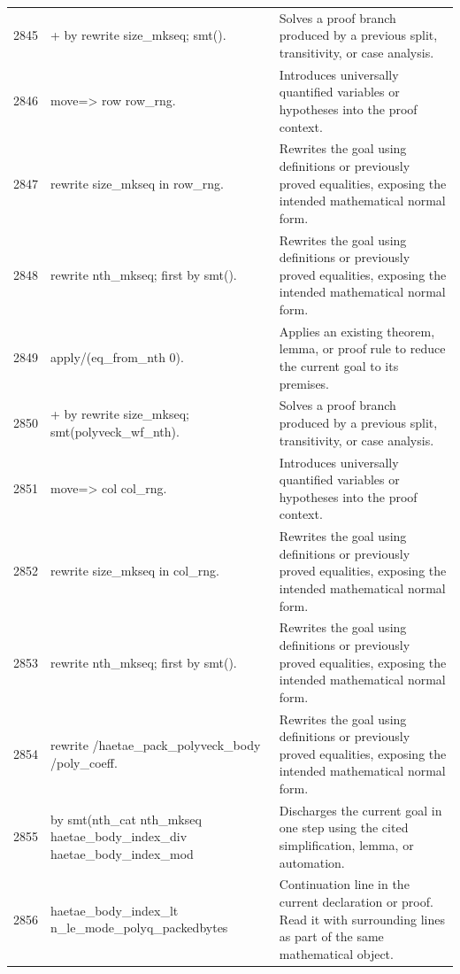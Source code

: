 \documentclass[10pt]{article}
\begin{document}
\begin{longtable}{r L{0.53\textwidth} L{0.37\textwidth}}
2845 & {\ttfamily\scriptsize + by rewrite size\_mkseq; smt().} & Solves a proof branch produced by a previous split, transitivity, or case analysis. \\
2846 & {\ttfamily\scriptsize move=> row row\_rng.} & Introduces universally quantified variables or hypotheses into the proof context. \\
2847 & {\ttfamily\scriptsize rewrite size\_mkseq in row\_rng.} & Rewrites the goal using definitions or previously proved equalities, exposing the intended mathematical normal form. \\
2848 & {\ttfamily\scriptsize rewrite nth\_mkseq; first by smt().} & Rewrites the goal using definitions or previously proved equalities, exposing the intended mathematical normal form. \\
2849 & {\ttfamily\scriptsize apply/(eq\_from\_nth 0).} & Applies an existing theorem, lemma, or proof rule to reduce the current goal to its premises. \\
2850 & {\ttfamily\scriptsize + by rewrite size\_mkseq; smt(polyveck\_wf\_nth).} & Solves a proof branch produced by a previous split, transitivity, or case analysis. \\
2851 & {\ttfamily\scriptsize move=> col col\_rng.} & Introduces universally quantified variables or hypotheses into the proof context. \\
2852 & {\ttfamily\scriptsize rewrite size\_mkseq in col\_rng.} & Rewrites the goal using definitions or previously proved equalities, exposing the intended mathematical normal form. \\
2853 & {\ttfamily\scriptsize rewrite nth\_mkseq; first by smt().} & Rewrites the goal using definitions or previously proved equalities, exposing the intended mathematical normal form. \\
2854 & {\ttfamily\scriptsize rewrite /haetae\_pack\_polyveck\_body /poly\_coeff.} & Rewrites the goal using definitions or previously proved equalities, exposing the intended mathematical normal form. \\
2855 & {\ttfamily\scriptsize by smt(nth\_cat nth\_mkseq haetae\_body\_index\_div haetae\_body\_index\_mod} & Discharges the current goal in one step using the cited simplification, lemma, or automation. \\
2856 & {\ttfamily\scriptsize        haetae\_body\_index\_lt n\_le\_mode\_polyq\_packedbytes} & Continuation line in the current declaration or proof.  Read it with surrounding lines as part of the same mathematical object. \\

\end{longtable}
\end{document}
